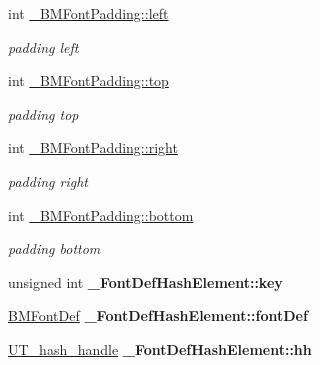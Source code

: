 \begin{DoxyCompactItemize}
\mbox{\label{group__label_ga8129887cd2f3f177100cd4fedf20e347}} 
int \hyperlink{group__label_ga8129887cd2f3f177100cd4fedf20e347}{\+\_\+\+B\+M\+Font\+Padding\+::left}
\begin{DoxyCompactList}\small\item\em padding left \end{DoxyCompactList}\item 
\mbox{\label{group__label_gad673e6ff522f10836afba0745f3c4ee8}} 
int \hyperlink{group__label_gad673e6ff522f10836afba0745f3c4ee8}{\+\_\+\+B\+M\+Font\+Padding\+::top}
\begin{DoxyCompactList}\small\item\em padding top \end{DoxyCompactList}\item 
\mbox{\label{group__label_gac83f97e64d8fa8a835a17c44d93f9f62}} 
int \hyperlink{group__label_gac83f97e64d8fa8a835a17c44d93f9f62}{\+\_\+\+B\+M\+Font\+Padding\+::right}
\begin{DoxyCompactList}\small\item\em padding right \end{DoxyCompactList}\item 
\mbox{\label{group__label_ga41ee44807cde2134c0ff73208dccf6e7}} 
int \hyperlink{group__label_ga41ee44807cde2134c0ff73208dccf6e7}{\+\_\+\+B\+M\+Font\+Padding\+::bottom}
\begin{DoxyCompactList}\small\item\em padding bottom \end{DoxyCompactList}\item 
\mbox{\label{group__label_gaa707ede0c1121fd031b1b905064f3939}} 
unsigned int {\bfseries \+\_\+\+Font\+Def\+Hash\+Element\+::key}
\item 
\mbox{\label{group__label_ga2c6a7e28eb19058966c07141285f3457}} 
\hyperlink{structBMFontDef}{B\+M\+Font\+Def} {\bfseries \+\_\+\+Font\+Def\+Hash\+Element\+::font\+Def}
\item 
\mbox{\label{group__label_ga0d67721facc6a1d012f086f994d76eed}} 
\hyperlink{structUT__hash__handle}{U\+T\+\_\+hash\+\_\+handle} {\bfseries \+\_\+\+Font\+Def\+Hash\+Element\+::hh}

\end{DoxyCompactItemize}
